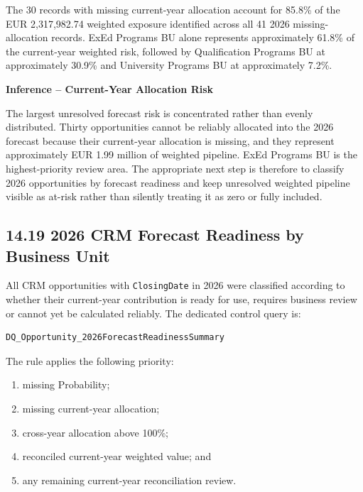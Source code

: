 \documentclass[11pt,a4paper]{article}
\begin{document}
The 30 records with missing current-year allocation account for 85.8\% of the
EUR 2,317,982.74 weighted exposure identified across all 41 2026 missing-
allocation records. ExEd Programs BU alone represents approximately 61.8\% of
the current-year weighted risk, followed by Qualification Programs BU at
approximately 30.9\% and University Programs BU at approximately 7.2\%.

\begin{inferencebox}

\textbf{Inference -- Current-Year Allocation Risk}

The largest unresolved forecast risk is concentrated rather than evenly
distributed. Thirty opportunities cannot be reliably allocated into the 2026
forecast because their current-year allocation is missing, and they represent
approximately EUR 1.99 million of weighted pipeline. ExEd Programs BU is the
highest-priority review area. The appropriate next step is therefore to classify
2026 opportunities by forecast readiness and keep unresolved weighted pipeline
visible as at-risk rather than silently treating it as zero or fully included.

\end{inferencebox}

\subsection{14.19 2026 CRM Forecast Readiness by Business Unit}

All CRM opportunities with \texttt{ClosingDate} in 2026 were classified according
to whether their current-year contribution is ready for use, requires business
review or cannot yet be calculated reliably. The dedicated control query is:

\begin{lstlisting}[style=powerquery]
DQ_Opportunity_2026ForecastReadinessSummary
\end{lstlisting}

The rule applies the following priority:

\begin{enumerate}[leftmargin=9mm,itemsep=2pt]
    \item missing Probability;
    \item missing current-year allocation;
    \item cross-year allocation above 100\%;
    \item reconciled current-year weighted value; and
    \item any remaining current-year reconciliation review.
\end{enumerate}
\end{document}
